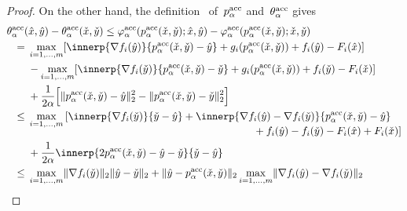 \documentclass[../main]{subfiles}
\begin{document}
\begin{proof}
    On the other hand, the definition~ of~$p^{\mathrm{acc}}_\alpha$ and~$\theta^{\mathrm{acc}}_\alpha$ gives
    \begin{align}
        \MoveEqLeft \theta^\acc_\alpha(\hat{x}, \hat{y}) - \theta^\acc_\alpha(\check{x}, \check{y}) \le \varphi^\acc_\alpha(p^\acc_\alpha(\check{x}, \check{y}); \hat{x}, \hat{y}) - \varphi^\acc_\alpha(p^\acc_\alpha(\check{x}, \check{y}); \check{x}, \check{y}) \\
        ={}   & \max_{i = 1, \dots, m} [\innerp{\nabla f_i(\hat{y})}{p^\acc_\alpha(\check{x}, \check{y}) - \hat{y}} + g_i(p^\acc_\alpha(\check{x}, \check{y})) + f_i(\hat{y}) - F_i(\hat{x})]                                                                       \\
              & - \max_{i = 1, \dots, m} [\innerp{\nabla f_i(\check{y})}{p^\acc_\alpha(\check{x}, \check{y}) - \check{y}} + g_i(p^\acc_\alpha(\check{x}, \check{y})) + f_i(\check{y}) - F_i(\check{x})]                                                             \\
              & + \frac{1}{2 \alpha} \Big[ \norm{p^\acc_\alpha(\check{x}, \check{y}) - \hat{y}}_2^2 - \norm{p^\acc_\alpha(\check{x}, \check{y}) - \check{y}}_2^2 \Big]                                                                                              \\
        \le{} & \max_{i = 1, \dots, m}
        \begin{multlined}[t]
            [ \innerp{\nabla f_i(\check{y})}{\check{y} - \hat{y}} + \innerp{\nabla f_i(\hat{y}) - \nabla f_i(\check{y})}{p^\acc_\alpha(\check{x}, \check{y}) - \hat{y}} \\
                + f_i(\hat{y}) - f_i(\check{y}) - F_i(\hat{x}) + F_i(\check{x}) ]
        \end{multlined}                                                                                                                                \\
              & + \frac{1}{2 \alpha} \innerp{2 p^\acc_\alpha(\check{x}, \check{y}) - \hat{y} - \check{y}}{\check{y} - \hat{y}}                                                                                                                                      \\
        \le{} & \max_{i = 1, \dots, m} \norm{\nabla f_i(\check{y})}_2 \norm{\hat{y} - \check{y}}_2 + \norm{\hat{y} - p^\acc_\alpha(\check{x}, \check{y})}_2 \max_{i = 1, \dots, m} \norm{\nabla f_i(\hat{y}) - \nabla f_i(\check{y})}_2                             \\

\end{align}
\end{proof}
\end{document}
